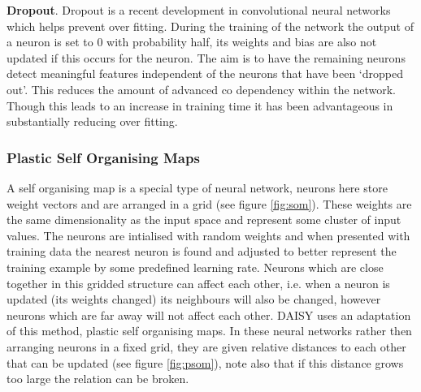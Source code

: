 \documentclass[11pt, titlepage, oneside]{article}
\theoremstyle{plain}
\theoremstyle{definition}
\theoremstyle{remark}
\begin{document}
			\noindent\textbf{Dropout}\cite{dropout}. Dropout is a recent development in convolutional neural networks which helps prevent over fitting. During the training of the network the output of a neuron is  set to $0$ with probability half, its weights and bias are also not updated if this occurs for the neuron. The aim is to have the remaining neurons detect meaningful features independent of the neurons that have been `dropped out'. This reduces the amount of advanced co dependency within the network. Though this leads to an increase in training time it has been advantageous in substantially reducing over fitting\cite{imagenet}.
			
		\subsubsection{Plastic Self Organising Maps}
			\label{subsec:psom}
			A self organising map is a special type of neural network, neurons here store weight vectors and are arranged in a grid (see figure \ref{fig:som}). These weights are the same dimensionality as the input space and represent some cluster of input values. The neurons are intialised with random weights and when presented with training data the nearest neuron is found and adjusted to better represent the training example by some predefined learning rate. Neurons which are close together in this gridded structure can affect each other, i.e. when a neuron is updated (its weights changed) its neighbours will also be changed, however neurons which are far away will not affect each other. DAISY uses an adaptation of this method\cite{science,dice}, plastic self organising maps. In these neural networks rather then arranging neurons in a fixed grid, they are given relative distances to each other that can be updated (see figure \ref{fig:psom}), note also that if this distance grows too large the relation can be broken.\\
\end{document}
